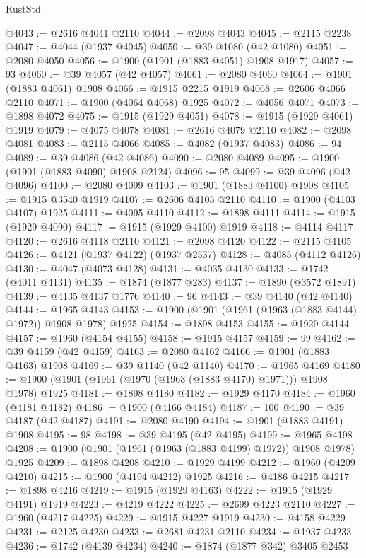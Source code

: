 \begin{lexlean}{RustStd}
\begin{coremodule}
@4043 := @2616 @4041 @2110
@4044 := @2098 @4043
@4045 := @2115 @2238
@4047 := @4044 (@1937 @4045)
@4050 := @39 @1080 (@42 @1080)
@4051 := @2080 @4050
@4056 := @1900 (@1901 (@1883 @4051) @1908 @1917)
@4057 := 93
@4060 := @39 @4057 (@42 @4057)
@4061 := @2080 @4060
@4064 := @1901 (@1883 @4061) @1908
@4066 := @1915 @2215 @1919
@4068 := @2606 @4066 @2110
@4071 := @1900 (@4064 @4068) @1925
@4072 := @4056 @4071
@4073 := @1898 @4072
@4075 := @1915 (@1929 @4051)
@4078 := @1915 (@1929 @4061) @1919
@4079 := @4075 @4078
@4081 := @2616 @4079 @2110
@4082 := @2098 @4081
@4083 := @2115 @4066
@4085 := @4082 (@1937 @4083)
@4086 := 94
@4089 := @39 @4086 (@42 @4086)
@4090 := @2080 @4089
@4095 := @1900 (@1901 (@1883 @4090) @1908 @2124)
@4096 := 95
@4099 := @39 @4096 (@42 @4096)
@4100 := @2080 @4099
@4103 := @1901 (@1883 @4100) @1908
@4105 := @1915 @3540 @1919
@4107 := @2606 @4105 @2110
@4110 := @1900 (@4103 @4107) @1925
@4111 := @4095 @4110
@4112 := @1898 @4111
@4114 := @1915 (@1929 @4090)
@4117 := @1915 (@1929 @4100) @1919
@4118 := @4114 @4117
@4120 := @2616 @4118 @2110
@4121 := @2098 @4120
@4122 := @2115 @4105
@4126 := @4121 (@1937 @4122) (@1937 @2537)
@4128 := @4085 (@4112 @4126)
@4130 := @4047 (@4073 @4128)
@4131 := @4035 @4130
@4133 := @1742 (@4011 @4131)
@4135 := @1874 (@1877 @283)
@4137 := @1890 (@3572 @1891)
@4139 := @4135 @4137 @1776
@4140 := 96
@4143 := @39 @4140 (@42 @4140)
@4144 := @1965 @4143
@4153 := @1900 (@1901 (@1961 (@1963 (@1883 @4144) @1972)) @1908 @1978) @1925
@4154 := @1898 @4153
@4155 := @1929 @4144
@4157 := @1960 (@4154 @4155)
@4158 := @1915 @4157
@4159 := 99
@4162 := @39 @4159 (@42 @4159)
@4163 := @2080 @4162
@4166 := @1901 (@1883 @4163) @1908
@4169 := @39 @1140 (@42 @1140)
@4170 := @1965 @4169
@4180 := @1900 (@1901 (@1961 (@1970 (@1963 (@1883 @4170) @1971))) @1908 @1978) @1925
@4181 := @1898 @4180
@4182 := @1929 @4170
@4184 := @1960 (@4181 @4182)
@4186 := @1900 (@4166 @4184)
@4187 := 100
@4190 := @39 @4187 (@42 @4187)
@4191 := @2080 @4190
@4194 := @1901 (@1883 @4191) @1908
@4195 := 98
@4198 := @39 @4195 (@42 @4195)
@4199 := @1965 @4198
@4208 := @1900 (@1901 (@1961 (@1963 (@1883 @4199) @1972)) @1908 @1978) @1925
@4209 := @1898 @4208
@4210 := @1929 @4199
@4212 := @1960 (@4209 @4210)
@4215 := @1900 (@4194 @4212) @1925
@4216 := @4186 @4215
@4217 := @1898 @4216
@4219 := @1915 (@1929 @4163)
@4222 := @1915 (@1929 @4191) @1919
@4223 := @4219 @4222
@4225 := @2699 @4223 @2110
@4227 := @1960 (@4217 @4225)
@4229 := @1915 @4227 @1919
@4230 := @4158 @4229
@4231 := @2125 @4230
@4233 := @2681 @4231 @2110
@4234 := @1937 @4233
@4236 := @1742 (@4139 @4234)
@4240 := @1874 (@1877 @342) @3405 @2453

\end{coremodule}
\end{lexlean}
